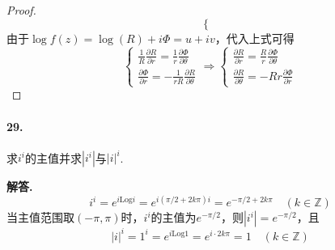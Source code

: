 \documentclass[12pt, a4paper, oneside]{ctexart}
\newenvironment{solution}{\par\noindent\textbf{解答. }}{\bigskip\par}
\begin{document}
\begin{proof}
\begin{equation*}
\begin{cases}
        \end{cases}
    \end{equation*}
    由于$\log f(z) = \log(R) + i\Phi = u+iv$，代入上式可得
    \begin{equation*}
            \begin{cases}
                \displaystyle\frac{1}{R}\frac{\partial R}{\partial r}=\frac{1}{r}\frac{\partial \Phi}{\partial \theta}\\
                \displaystyle\frac{\partial \Phi}{\partial r}=-\frac{1}{rR}\frac{\partial R}{\partial \theta}
            \end{cases}
            \Rightarrow\begin{cases}
                \displaystyle\frac{\partial R}{\partial r}=\frac{R}{r}\frac{\partial \Phi}{\partial \theta}\\
                \displaystyle\frac{\partial R}{\partial \theta}=-Rr\frac{\partial \Phi}{\partial r}
            \end{cases}
    \end{equation*}
\end{proof}
\paragraph{29.}求$i^i$的主值并求$|i^i|$与$|i|^i$.
\def\Log{\text{Log}} %
\begin{solution}
    \begin{equation*} 
            i^i=e^{i\Log i} = e^{i(\pi/2+2k\pi)i} = e^{-\pi/2+2k\pi}\quad(k\in\mathbb{Z})
    \end{equation*}
    当主值范围取$(-\pi, \pi)$时，$i^i$的主值为$e^{-\pi/2}$，则$|i^i| = e^{-\pi/2}$，且
    \begin{equation*}
        |i|^i=1^i=e^{i\Log 1} = e^{i\cdot 2k\pi} = 1\quad(k\in\mathbb{Z})
    \end{equation*}
\end{solution}
\iffalse
\centerline{
    \texttt{[image: figure.png]}
}
\fi
\iffalse
\renewcommand\arraystretch{0.8} %
\begin{table}[!htbp] %
    \centering %
    \begin{tabular}{p{1cm}<{\centering}p{1cm}<{\centering}p{3cm}<{\centering}p{5cm}<{\centering}} %
        \toprule
        $x_i$ & $f[x_1]$ & $f[x_i,x_{i+1}]$ & $f[x_i,x_{i+1},x_{i+2}]$ \\
        \midrule
        $x_0$ & $f(x_0)$ &                  &                          \\
        $x_0$ & $f(x_0)$ & $f'(x_0)$        &                          \\
        $x_0$ & $f(x_1)$ & $\frac{f(x_1)-f(x_0)}{x_1-x_0}$ & $\frac{f(x_1)-f(x_0)}{(x_1-x_0)^2}-\frac{f'(x_0)}{x_1-x_0}$\\
        \bottomrule
    \end{tabular}
\end{table}
\fi
\end{document}
